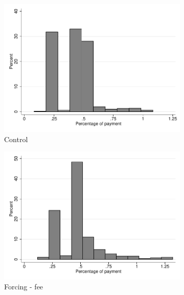 \documentclass[11pt]{article}
\begin{document}
\begin{figure}[H]
        \caption{Percentage of payment conditional on positive payment and Losing Pawn}
    \label{perc_payments_conditional}
    \begin{center}
    \begin{subfigure}{.31\textwidth}
    \caption{Control}
        \centering
        \includegraphics[width=\textwidth]{Figuras/hist_porc_pay_cond_pro_1.pdf}
    \end{subfigure}
    \begin{subfigure}{.31\textwidth}
    \caption{Forcing - fee}
        \centering
        \includegraphics[width=\textwidth]{Figuras/hist_porc_pay_cond_pro_2.pdf}
    \end{subfigure}   
     \begin{subfigure}{.31\textwidth}

\end{subfigure}
\end{center}
\end{figure}
\end{document}
